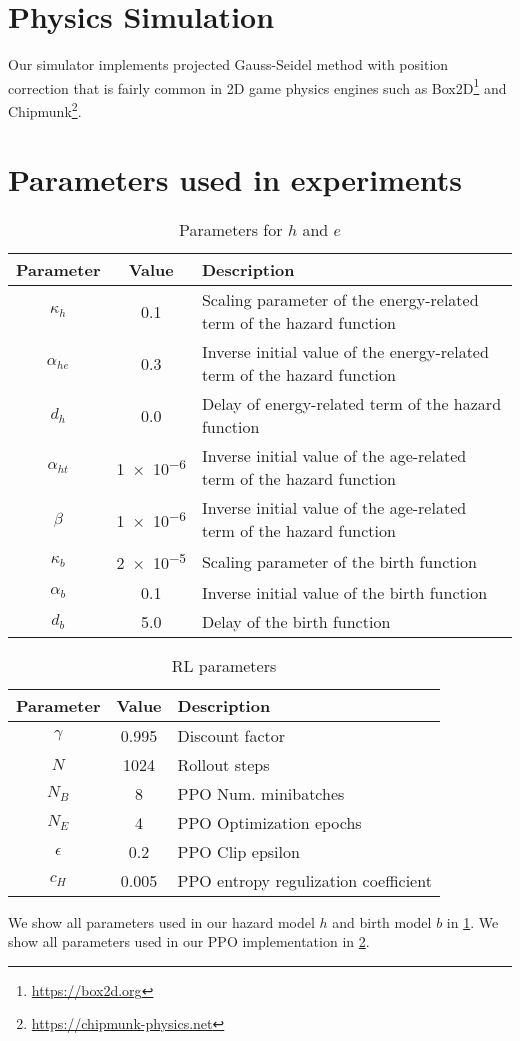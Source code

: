 \section{Physics Simulation}\label{ap:phys}
Our simulator implements projected Gauss-Seidel method with position correction \citep{catto2005iterative} that is fairly common in 2D game physics engines such as Box2D\footnote{\url{https://box2d.org}} and Chipmunk\footnote{\url{https://chipmunk-physics.net}}.

\section{Parameters used in experiments}\label{ap:param}

\begin{table}[t]
  \centering
  \caption{Parameters for $h$ and $e$}\label{tab:bd-param}
  \begin{tabular}{ccl}
  \toprule
    Parameter & Value & Description \\
    \midrule
    $\kappa_{h}$ & 0.1 & Scaling parameter of the energy-related term of the hazard function \\
    $\alpha_{he}$ & 0.3 & Inverse initial value of the energy-related term of the hazard function \\
    $d_{h}$ & 0.0 & Delay of energy-related term of the hazard function \\
    $\alpha_{ht}$ & \num{1e-6} & Inverse initial value of the age-related term of the hazard function \\
    $\beta$ & \num{1e-6} & Inverse initial value of the age-related term of the hazard function \\
    $\kappa_{b}$ & \num{2e-5} & Scaling parameter of the birth function\\
    $\alpha_{b}$ & 0.1 & Inverse initial value of the birth function \\
    $d_{b}$ & 5.0 & Delay of the birth function \\
    \bottomrule
  \end{tabular}
\end{table}

\begin{table}[t]
  \centering
  \caption{RL parameters}\label{tab:rl-param}
  \begin{tabular}{ccl}
  \toprule
    Parameter & Value & Description \\
    \midrule
    $\gamma$ & 0.995 & Discount factor \\
    $N$ & 1024 & Rollout steps \\
    $N_{B}$ & 8 & PPO Num. minibatches \\
    $N_{E}$ & 4 & PPO Optimization epochs \\
    $\epsilon$ & 0.2 & PPO Clip epsilon \\
    $c_{H}$ & 0.005 & PPO entropy regulization coefficient \\
  \end{tabular}
\end{table}

We show all parameters used in our hazard model $h$ and birth model $b$ in \cref{tab:bd-param}.
We show all parameters used in our PPO implementation in \cref{tab:rl-param}.